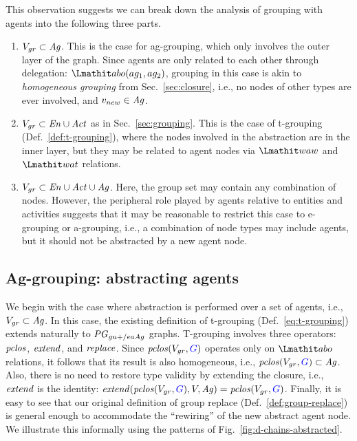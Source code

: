 This observation suggests we can break down the analysis of grouping with agents into the following three parts.
%
\begin{enumerate}
\item $V_{gr} \subset \mathit{Ag}$. This is the case for ag-grouping, which only involves the outer layer of the graph. Since agents are only related to each other through delegation: $\delegate(ag_1 , ag_2)$, grouping in this case is akin to \textit{homogeneous grouping} from Sec.~\ref{sec:closure}, i.e., no nodes of other types are ever involved, and $v_{new} \in \mathit{Ag}$.

\item $V_{gr} \subset \mathit{En} \cup \mathit{Act}$ as in Sec.~\ref{sec:grouping}. This is the case of t-grouping (Def.~\ref{def:t-grouping}), where the nodes involved in the abstraction are in the inner layer, but they may be related to agent nodes via $\waw$ and $\wat$ relations.

\item $V_{gr} \subset \mathit{En} \cup \mathit{Act} \cup \mathit{Ag}$.  Here, the group set may contain any combination of nodes. However, the peripheral role played by agents relative to entities and activities suggests that it may be reasonable to restrict this case to e-grouping or a-grouping, i.e., a combination of node types may include agents, but it should not be abstracted by a new agent node.
%
\end{enumerate}



\subsection{Ag-grouping: abstracting agents}  \label{sec:ag-grouping}

We begin with the case where abstraction is performed over a set of agents, i.e., $V_{gr} \subset \mathit{Ag}$.
%
In this case, the existing definition of t-grouping (Def.~\ref{eq:t-grouping}) extends naturally to $\mathit{PG}_{gu+/eaAg}$ graphs.
%
%
T-grouping involves three operators: $\mathit{pclos}$, $\mathit{extend}$, and $\mathit{replace}$.
%
Since $\clos(V_{gr}, \jwb{G})$ operates only on $\delegate$ relations, it follows that its result is also homogeneous, i.e., $\clos(V_{gr}, \jwb{G}) \subset \ag$. Also, there is no need to restore type validity by extending the closure, i.e., $\mathit{extend}$ is the identity: $\extend(\clos(V_{gr},  \jwb{G}), V, \ag) = \clos(V_{gr},  \jwb{G})$.
%
Finally, it is easy to see that our original definition of group replace (Def.~\ref{def:group-replace}) is general enough to accommodate the ``rewiring'' of the new abstract agent node. 
%
We illustrate this informally using the patterns of Fig.~\ref{fig:d-chains-abstracted}.
%

